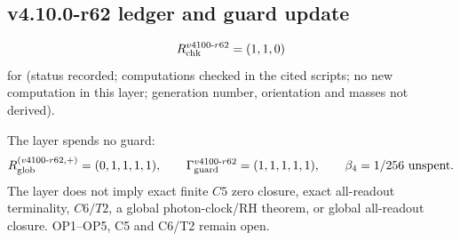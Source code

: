 \subsection*{v4.10.0-r62 ledger and guard update}
\label{subsec:v4100-r62-ledger-guard}

\[
R_{\rm chk}^{v4100\text{-}r62}=(1,1,0)
\]
for (status recorded; computations checked in the cited scripts; no new computation in this layer; generation number, orientation and masses not derived).

The layer spends no guard:
\[
R_{\rm glob}^{(v4100\text{-}r62,+)}=(0,1,1,1,1),
\qquad
\Gamma_{\rm guard}^{v4100\text{-}r62}=(1,1,1,1,1),
\qquad
\beta_4=1/256\ \text{unspent}.
\]
The layer does not imply exact finite \(C5\) zero closure, exact all-readout terminality, \(C6/T2\), a global photon-clock/RH theorem,
or global all-readout closure.  OP1--OP5, C5 and C6/T2 remain open.
